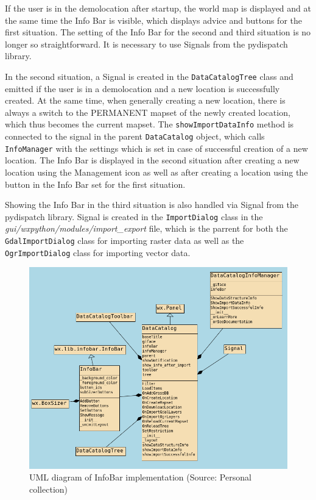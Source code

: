 \documentclass[a4paper,10pt,twoside]{article}
\begin{document}
If the user is in the demolocation after startup, the world map is displayed and at the same time the Info Bar is visible, which displays advice and buttons for the first situation. The setting of the Info Bar for the second and third situation is no longer so straightforward. It is necessary to use Signals from the pydispatch library.

In the second situation, a Signal is created in the \texttt{DataCatalogTree} class and emitted if the user is in a demolocation and a new location is successfully created. At the same time, when generally creating a new location, there is always a switch to the PERMANENT mapset of the newly created location, which thus becomes the current mapset. The \texttt{showImportDataInfo} method is connected to the signal in the parent \texttt{DataCatalog} object, which calls \texttt{InfoManager} with the settings which is set in case of successful creation of a new location. The Info Bar is displayed in the second situation after creating a new location using the Management icon as well as after creating a location using the button in the Info Bar set for the first situation.

Showing the Info Bar in the third situation is also handled via Signal from the pydispatch library. Signal is created in the \texttt{ImportDialog} class in the \textit{gui/wxpython/modules/import\_export} file, which is the parrent for both the \texttt{GdalImportDialog} class for importing raster data as well as the \texttt{OgrImportDialog} class for importing vector data. 

\vspace{0.3cm}
\begin{figure}[hbt!] 
\begin{center}
\includegraphics[width=17cm]{../pictures/uml_chart.png} 
\caption[UML diagram of InfoBar implementation]{UML diagram of InfoBar implementation (Source: Personal collection)}
\label{fig:uml_chart}
\end{center}
\end{figure}
\end{document}
